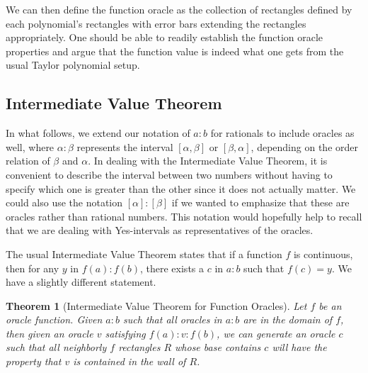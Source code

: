 \documentclass[12pt]{article}
\newtheorem{theorem}{Theorem}[subsection]
\theoremstyle{remark}
\begin{document}
We can then define the function oracle as the collection of rectangles defined by each polynomial's rectangles with error bars extending the rectangles appropriately. One should be able to readily establish the function oracle properties and argue that the function value is indeed what one gets from the usual Taylor polynomial setup. 



\subsection{Intermediate Value Theorem}

In what follows, we extend our notation of $a:b$ for rationals to include oracles as well, where $\alpha : \beta$ represents the interval $[\alpha,\beta]$ or $[\beta, \alpha]$, depending on the order relation of $\beta$ and $\alpha$. In dealing with the Intermediate Value Theorem, it is convenient to describe the interval between two numbers without having to specify which one is greater than the other since it does not actually matter. We could also use the notation $[\alpha]:[\beta]$ if we wanted to emphasize that these are oracles rather than rational numbers. This notation would hopefully help to recall that we are dealing with Yes-intervals as representatives of the oracles.

The usual Intermediate Value Theorem states that if a function $f$ is continuous, then for any $y$ in $f(a):f(b)$, there exists a $c$ in $a:b$ such that $f(c) = y$. We have a slightly different statement.

\begin{theorem}[Intermediate Value Theorem for Function Oracles]
Let $f$ be an oracle function. Given $a:b$ such that all oracles in $a:b$ are in the domain of $f$, then given an oracle $v$ satisfying $f(a):v:f(b)$, we can generate an oracle $c$ such that all neighborly $f$ rectangles $R$ whose base contains $c$ will have the property that $v$ is contained in the wall of $R$.
\end{theorem}
\end{document}
